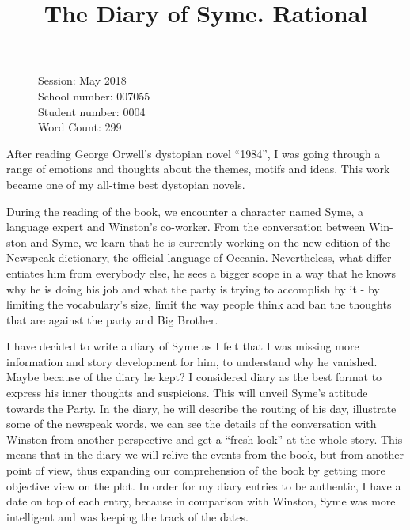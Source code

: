 \documentclass[12pt,a4paper]{article}
\title{The Diary of Syme. Rational}
\author{}
\date{}
\begin{document}
\maketitle
\begin{flushleft}
  \begin{figure}
    Session: May 2018\\
    School number: 007055\\
    Student number: 0004\\
    Word Count: 299\\
    \end{figure}
  \end{flushleft}
\newpage

After reading George Orwell’s dystopian novel “1984”, I was going through a range of emotions and thoughts about the themes, motifs and ideas. This work became one of my all-time best dystopian novels.

During the reading of the book, we encounter a character named Syme, a language expert and Winston’s co-worker. From the conversation between Win- ston and Syme, we learn that he is currently working on the new edition of the Newspeak dictionary, the official language of Oceania. Nevertheless, what differ- entiates him from everybody else, he sees a bigger scope in a way that he knows why he is doing his job and what the party is trying to accomplish by it - by limiting the vocabulary’s size, limit the way people think and ban the thoughts that are against the party and Big Brother. 

I have decided to write a diary of Syme as I felt that I was missing more information and story development for him, to understand why he vanished. Maybe because of the diary he kept? I considered diary as the best format to express his inner thoughts and suspicions. This will unveil Syme’s attitude towards the Party. In the diary, he will describe the routing of his day, illustrate some of the newspeak words, we can see the details of the conversation with Winston from another perspective and get a “fresh look” at the whole story. This means that in the diary we will relive the events from the book, but from another point of view, thus expanding our comprehension of the book by getting more objective view on the plot. In order for my diary entries to be authentic, I have a date on top of each entry, because in comparison with Winston, Syme was more intelligent and was keeping the track of the dates.
\end{document}
